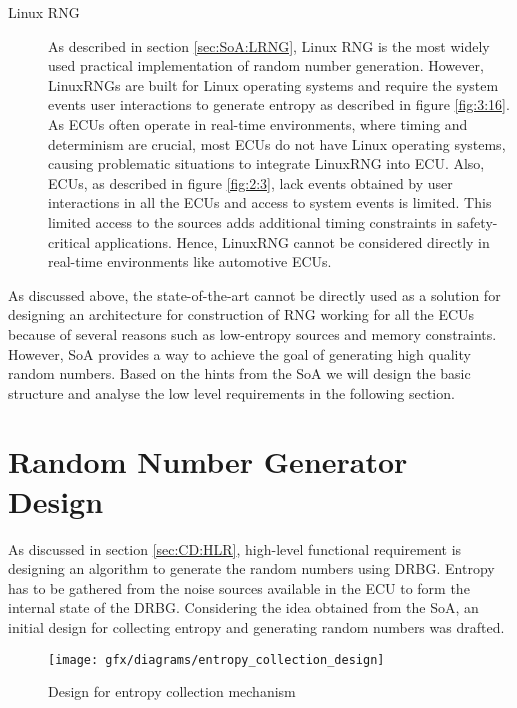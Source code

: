 \begin{description}
	\item[Linux RNG] As described in section \ref{sec:SoA:LRNG}, Linux RNG is the most widely used practical implementation of random number generation. However, LinuxRNGs are built for Linux operating systems and require the system events user interactions to generate entropy as described in figure \ref{fig:3:16}. As ECUs often operate in real-time environments, where timing and determinism are crucial, most ECUs do not have Linux operating systems, causing problematic situations to integrate LinuxRNG into ECU. Also, ECUs, as described in figure \ref{fig:2:3}, lack events obtained by user interactions in all the ECUs and access to system events is limited. This limited access to the sources adds additional timing constraints in safety-critical applications. Hence, LinuxRNG cannot be considered directly in real-time environments like automotive ECUs.  
	
\end{description}

As discussed above, the state-of-the-art cannot be directly used as a solution for designing an architecture for construction of RNG working for all the ECUs because of several reasons such as low-entropy sources and memory constraints. However, SoA provides a way to achieve the goal of generating high quality random numbers. Based on the hints from the SoA we will design the basic structure and analyse the low level requirements in the following section.

%
%
\section{Random Number Generator Design}
\label{sec:CD:RNGD}
As discussed in section \ref{sec:CD:HLR}, high-level functional requirement is designing an algorithm to generate the random numbers using DRBG. Entropy has to be gathered from the noise sources available in the ECU to form the internal state of the DRBG. Considering the idea obtained from the SoA, an initial design for collecting entropy and generating random numbers was drafted. 

\begin{figure}[!h]
	\centering
	\texttt{[image: gfx/diagrams/entropy\_collection\_design]}
	\caption{Design for entropy collection mechanism}
	\label{fig:4:3}
\end{figure}


